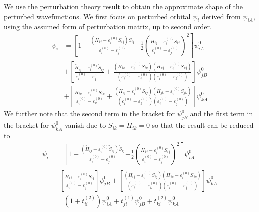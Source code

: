 \documentclass{article}
\newcommand{\order}[2]{#1^{(#2)}}
\begin{document}
We use the perturbation theory result to obtain the approximate shape of the perturbed 
wavefunctions. We first focus on perturbed orbital $\psi_{i}$ derived from $\psi_{iA}$, 
using the assumed form of perturbation matrix, up to second order.
\begin{align}
    \psi_{i} &= 
    \left[ 1 -  \frac{(\tilde{H}_{ij} - \order{\varepsilon_i}{0}\tilde{S}_{ij})\tilde{S}_{ij}}{\order{\varepsilon_i}{0} - \order{\varepsilon_j}{0}} \right.
    \left. - \frac{1}{2} \left(\frac{\tilde{H}_{ij} - \order{\varepsilon_i}{0}\tilde{S}_{ij}}{\order{\varepsilon_i}{0} - \order{\varepsilon_j}{0}} \right)^2 \right] \psi_{iA}^0 \\ 
    &+ \left[ \frac{\tilde{H}_{ij}- \order{\varepsilon_i}{0} \tilde{S}_{ij}}{\order{\varepsilon_i}{0} - \order{\varepsilon_j}{0}} \right.
    + \left. \frac{(\tilde{H}_{ik}- \order{\varepsilon_i}{0} \tilde{S}_{ik})(\tilde{H}_{kj}- \order{\varepsilon_i}{0} \tilde{S}_{kj})}{(\order{\varepsilon_i}{0} - \order{\varepsilon_j}{0})(\order{\varepsilon_i}{0} - \order{\varepsilon_k}{0})} \right] \psi_{jB}^0  \\
    &+ \left[ \frac{\tilde{H}_{ik}- \order{\varepsilon_i}{0} \tilde{S}_{ik}}{\order{\varepsilon_i}{0} - \order{\varepsilon_k}{0}} \right.
    + \left. \frac{(\tilde{H}_{ij}- \order{\varepsilon_i}{0} \tilde{S}_{ij})(\tilde{H}_{jk}- \order{\varepsilon_i}{0} \tilde{S}_{jk})}{(\order{\varepsilon_i}{0} - \order{\varepsilon_k}{0})(\order{\varepsilon_i}{0} - \order{\varepsilon_j}{0})} \right] \psi_{kA}^0 
\end{align}
We further note that the second term in the bracket for $\psi_{jB}^0$ and the first term in the bracket for $\psi_{kA}^0$ vanish due to $\tilde{S}_{ik} = \tilde{H}_{ik} = 0$
so that the result can be reduced to 
\begin{align}
    \psi_{i} &= 
    \left[ 1 -  \frac{(\tilde{H}_{ij} - \order{\varepsilon_i}{0}\tilde{S}_{ij})\tilde{S}_{ij}}{\order{\varepsilon_i}{0} - \order{\varepsilon_j}{0}} \right.
    \left. - \frac{1}{2} \left(\frac{\tilde{H}_{ij} - \order{\varepsilon_i}{0}\tilde{S}_{ij}}{\order{\varepsilon_i}{0} - \order{\varepsilon_j}{0}} \right)^2 \right] \psi_{iA}^0 \\ 
    &+ \left[ \frac{\tilde{H}_{ij}- \order{\varepsilon_i}{0} \tilde{S}_{ij}}{\order{\varepsilon_i}{0} - \order{\varepsilon_j}{0}} \right] \psi_{jB}^0 
    + \left[ \frac{(\tilde{H}_{ij}- \order{\varepsilon_i}{0} \tilde{S}_{ij})(\tilde{H}_{jk}- \order{\varepsilon_i}{0} \tilde{S}_{jk})}{(\order{\varepsilon_i}{0} - \order{\varepsilon_k}{0})(\order{\varepsilon_i}{0} - \order{\varepsilon_j}{0})} \right] \psi_{kA}^0 \\
    &= (1 + \order{t_{ii}}{2}) \psi_{iA}^0 + \order{t_{ji}}{1} \psi_{jB}^0 + \order{t_{ki}}{2}\psi_{kA}^0
\end{align}
\end{document}
